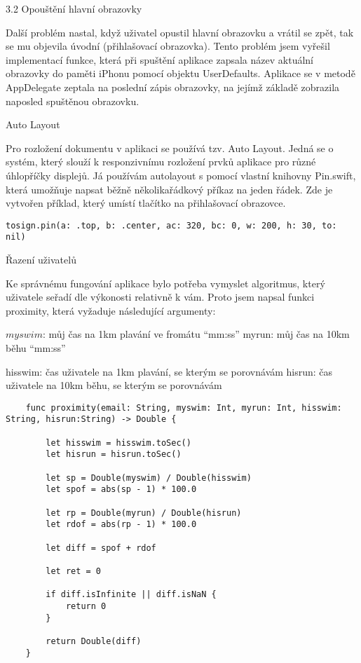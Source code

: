 \documentclass{article}
\begin{document}
\vspace{10 mm}
3.2 Opouštění hlavní obrazovky

Další problém nastal, když uživatel opustil hlavní obrazovku a vrátil se zpět, tak se mu objevila úvodní (přihlašovací obrazovka). Tento problém jsem vyřešil implementací funkce, která při spuštění aplikace zapsala název aktuální obrazovky do paměti iPhonu pomocí objektu UserDefaults. Aplikace se v metodě AppDelegate zeptala na poslední zápis obrazovky, na jejímž základě zobrazila naposled spuštěnou obrazovku.


\vspace{10 mm}
Auto Layout

Pro rozložení dokumentu v aplikaci se používá tzv. Auto Layout. Jedná se o systém, který slouží k responzivnímu rozložení prvků aplikace pro různé úhlopříčky displejů. 
Já používám autolayout s pomocí vlastní knihovny Pin.swift, která umožňuje napsat běžně několikařádkový příkaz na jeden řádek. Zde je vytvořen příklad, který umístí tlačítko na přihlašovací obrazovce.



\vspace{10 mm}
\begin{verbatim}
tosign.pin(a: .top, b: .center, ac: 320, bc: 0, w: 200, h: 30, to: nil)
\end{verbatim}


\vspace{10 mm}
Řazení uživatelů 

Ke správnému fungování aplikace bylo potřeba vymyslet algoritmus, který uživatele seřadí dle výkonosti relativně k vám. Proto jsem napsal funkci proximity, která vyžaduje následující argumenty:

$myswim$: můj čas na 1km plavání ve fromátu “mm:ss”
myrun: můj čas na 10km běhu “mm:ss”

hisswim: čas uživatele na 1km plavání, se kterým se porovnávám 
hisrun: čas uživatele na 10km běhu, se kterým se porovnávám 



\vspace{10 mm}
  \begin{verbatim}
    func proximity(email: String, myswim: Int, myrun: Int, hisswim: String, hisrun:String) -> Double {
        
        let hisswim = hisswim.toSec()
        let hisrun = hisrun.toSec()
        
        let sp = Double(myswim) / Double(hisswim)       
        let spof = abs(sp - 1) * 100.0
        
        let rp = Double(myrun) / Double(hisrun)
        let rdof = abs(rp - 1) * 100.0
        
        let diff = spof + rdof
        
        let ret = 0
        
        if diff.isInfinite || diff.isNaN {
            return 0
        }
        
        return Double(diff)
    }
 \end{verbatim}
\end{document}
